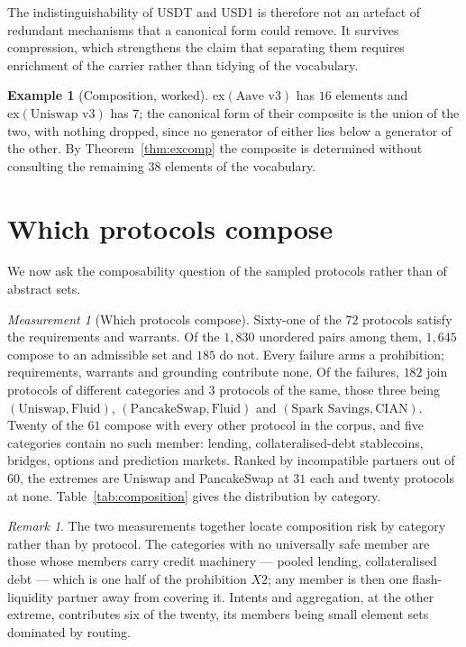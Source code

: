 \documentclass[11pt,reqno]{amsart}
\theoremstyle{plain}
\theoremstyle{definition}
\newtheorem{example}[theorem]{Example}
\theoremstyle{remark}
\newtheorem{measurement}[theorem]{Measurement}
\newtheorem{remark}[theorem]{Remark}
\begin{document}
The indistinguishability of USDT and USD1 is therefore not an artefact of
redundant mechanisms that a canonical form could remove. It survives compression,
which strengthens the claim that separating them requires enrichment of the
carrier rather than tidying of the vocabulary.

\begin{example}[Composition, worked]\label{ex:comp}
$\mathrm{ex}(\text{Aave~v3})$ has $16$ elements and
$\mathrm{ex}(\text{Uniswap~v3})$ has $7$; the canonical form of their composite is
the union of the two, with nothing dropped, since no generator of either lies
below a generator of the other. By Theorem~\ref{thm:excomp} the composite is
determined without consulting the remaining $38$ elements of the vocabulary.
\end{example}

\section{Which protocols compose}\label{sec:pairs}

We now ask the composability question of the sampled protocols rather than
of abstract sets.

\begin{measurement}[Which protocols compose]\label{meas:pairs}
Sixty-one of the $72$ protocols satisfy the requirements and warrants. Of the
$1{,}830$ unordered pairs among them, $1{,}645$ compose to an admissible set and
$185$ do not. Every failure arms a prohibition; requirements, warrants and
grounding contribute none. Of the failures, $182$ join protocols of different
categories and $3$ protocols of the same, those three being
$(\text{Uniswap}, \text{Fluid})$, $(\text{PancakeSwap}, \text{Fluid})$ and
$(\text{Spark Savings}, \text{CIAN})$. Twenty of the $61$ compose with every
other protocol in the corpus, and five categories contain no such member:
lending, collateralised-debt stablecoins, bridges, options and prediction
markets. Ranked by incompatible partners out of $60$, the extremes are Uniswap
and PancakeSwap at $31$ each and twenty protocols at none.
Table~\ref{tab:composition} gives the distribution by category.
\end{measurement}

\begin{remark}
The two measurements together locate composition risk by category rather than by
protocol. The categories with no universally safe member are those whose members
carry credit machinery --- pooled lending, collateralised debt --- which is one
half of the prohibition $X2$; any member is then one flash-liquidity partner away
from covering it. Intents and aggregation, at the other extreme, contributes six
of the twenty, its members being small element sets dominated by routing.
\end{remark}
\end{document}
